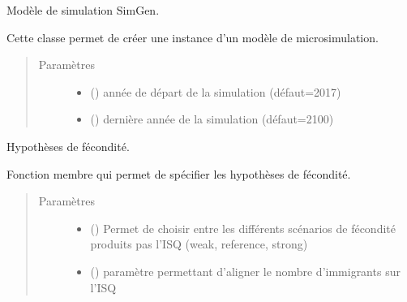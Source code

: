 \documentclass[letterpaper,10pt,french]{sphinxmanual}
\begin{document}
\begin{fulllineitems}
\label{\detokenize{code:simgen.model}}
Modèle de simulation SimGen.

Cette classe permet de créer une instance d’un modèle de microsimulation.
\begin{quote}\begin{description}
\item[{Paramètres}] \leavevmode\begin{itemize}
\item {} 
 () \textendash{} année de départ de la simulation (défaut=2017)

\item {} 
 () \textendash{} dernière année de la simulation (défaut=2100)

\end{itemize}

\end{description}\end{quote}

\begin{fulllineitems}
\label{\detokenize{code:simgen.model.birth_assumptions}}
Hypothèses de fécondité.

Fonction membre qui permet de spécifier les hypothèses de fécondité.
\begin{quote}\begin{description}
\item[{Paramètres}] \leavevmode\begin{itemize}
\item {} 
 () \textendash{} Permet de choisir entre les différents scénarios de fécondité produits pas l’ISQ (weak, reference, strong)

\item {} 
 () \textendash{} paramètre permettant d’aligner le nombre d’immigrants sur l’ISQ


\end{itemize}
\end{description}
\end{quote}
\end{fulllineitems}
\end{fulllineitems}
\end{document}
